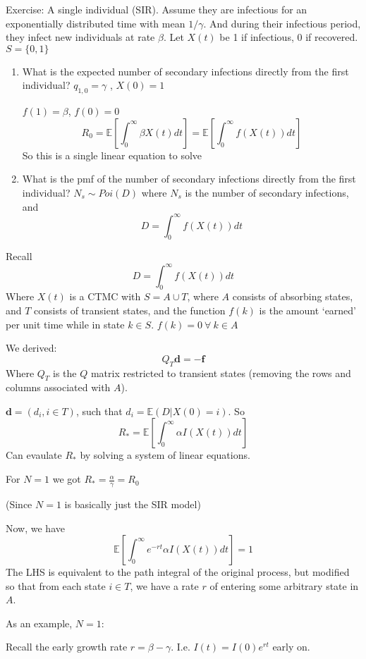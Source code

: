 \documentclass{/home/janmebows/Documents/LatexTemplates/myassignment}
\begin{document}
Exercise: A single individual (SIR).
Assume they are infectious for an exponentially distributed time with mean $1/\gamma$. And during their infectious period, they infect new individuals at rate $\beta$.
Let $X(t)$ be 1 if infectious, 0 if recovered. $S = \{0,1\}$ 
\begin{enumerate}
    \item What is the expected number of secondary infections directly from the first individual?
    $q_{1,0} = \gamma$ , $X(0) =1$

    $f(1) = \beta$, $f(0) = 0$
    \[R_0 = \mathbb{E}\left[\int_0^\infty \beta X(t) dt\right] = \mathbb{E}\left[\int_0^\infty f(X(t)) dt\right]\]
    So this is a single linear equation to solve

    \item What is the pmf of the number of secondary infections directly from the first individual?
    $N_s \sim Poi(D)$ where 
    $N_s$ is the number of secondary infections, and 
    \[D = \int_0^\infty f(X(t)) dt\]

\end{enumerate}



Recall
\[D = \int_0^\infty f(X(t)) dt\]
Where $X(t)$ is a CTMC with $S = A\cup T$, where $A$ consists of absorbing states, and $T$ consists of transient states, and the function $f(k)$ is the amount `earned' per unit time while in state $k\in S$. $f(k) = 0 \ \forall \ k \in A$

We derived:
\[Q_T \mathbf{d} = - \mathbf{f}\]
Where $Q_T$ is the $Q$ matrix restricted to transient states (removing the rows and columns associated with $A$). 

$\mathbf{d} = (d_i, i \in T)$, such that $d_i = \mathbb{E}(D | X(0) = i)$. So
\[R_* = \mathbb{E}\left[\int_0^\infty \alpha I(X(t)) dt\right]\]
Can evaulate $R_*$ by solving a system of linear equations.

For $N=1$ we got $R_* = \frac{\alpha}{\gamma} = R_0$

(Since $N=1$ is basically just the SIR model)


Now, we have
\[ \mathbb{E}\left[\int_0^\infty e^{-rt} \alpha I(X(t)) dt\right]=1\]
The LHS is equivalent to the path integral of the original process, but modified so that from each state $i\in T$, we have a rate $r$ of entering some arbitrary state in $A$.


As an example, $N=1$:

Recall the early growth rate $r = \beta- \gamma$. I.e. $I(t) = I(0) e^{rt}$ early on.
\end{document}
